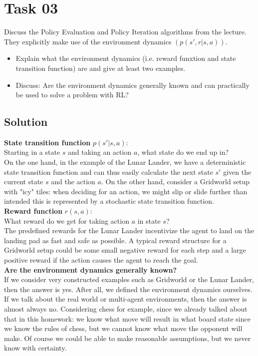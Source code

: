 \documentclass{article}
\begin{document}
\section{Task 03}
Discuss the Policy Evaluation and Policy Iteration algorithms from the lecture.
They explicitly make use of the environment dynamics $(p(s', r | s, a))$.
\begin{itemize}
    \item Explain what the environment dynamics (i.e. reward funxtion and
    state transition function) are and give at least two examples.
    \item Discuss: Are the environment dynamics generally known and can practically
    be used to solve a problem with RL?
\end{itemize}
\subsection{Solution}
\textbf{State transition function} $p(s' | s, a)$: \\
Starting in a state $s$ and taking an action $a$, what state do we end up in? \\
On the one hand, in the example of the Lunar Lander, we have a deterministic state transition function
and can thus easily calculate the next state $s'$ given the current state $s$ and the action $a$. 
On the other hand, consider a Gridworld setup with "icy" tiles: when deciding for an action, we might
slip or slide further than intended \textemdash this is represented by a stochastic state transition function. \\

\textbf{Reward function} $r(s, a)$: \\
What reward do we get for taking action $a$ in state $s$? \\
The predefined rewards for the Lunar Lander incentivize the agent to land on the landing pad as fast 
and safe as possible. A typical reward structure for a Gridworld setup could be some small negative reward
for each step and a large positive reward if the action causes the agent to reach the goal. \\

\textbf{Are the environment dynamics generally known?} \\
If we consider very constructed examples such as Gridworld or the Lunar Lander, then the answer is yes.
After all, we defined the environment dynamics ourselves. If we talk about the real world or
multi-agent environments, then the answer is almost always no. 
Considering chess for example, since we already talked about
that in this homework: we know what move will result in what board state since we know the
rules of chess, but we cannot know what move the opponent will make. Of course we could be able to make 
reasonable assumptions, but we never know with certainty. \\




\end{document}
